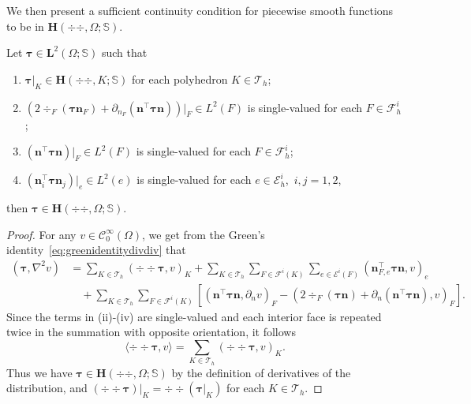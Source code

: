 We then present a sufficient continuity condition for piecewise smooth functions to be in $\boldsymbol{H}(\div{\div },\Omega; \mathbb{S})$. %




\begin{lemma}\label{lem:Hdivdivpatching}
Let $\boldsymbol \tau\in \boldsymbol  L^2(\Omega;\mathbb S)$ such that
\begin{enumerate}[\rm (i)]
\item $\boldsymbol \tau|_K\in \boldsymbol{H}(\div{\div },K; \mathbb{S})$ for each polyhedron  $K\in\mathcal T_h$;

\smallskip
\item $(2\div_F(\boldsymbol\tau \boldsymbol n_F)+ \partial_{n_F}(\boldsymbol n^{\intercal} \boldsymbol \tau\boldsymbol n))|_F\in L^2(F)$ is single-valued for each $F\in\mathcal F_h^i$;

\smallskip
\item $(\boldsymbol  n^{\intercal}\boldsymbol \tau\boldsymbol  n)|_F\in L^2(F)$ is single-valued for each $F\in\mathcal F_h^i$;

\smallskip
\item $(\boldsymbol  n_i^{\intercal}\boldsymbol \tau\boldsymbol  n_j)|_e\in L^2(e)$ is single-valued for each $e\in\mathcal E_h^i$, $\, i, j=1, 2$,

\end{enumerate}
then $\boldsymbol \tau\in \boldsymbol{H}(\div{\div },\Omega; \mathbb{S})$.
\end{lemma}
\begin{proof}
For any $v\in \mathcal C_0^{\infty}(\Omega)$, we get from the Green's identity~\eqref{eq:greenidentitydivdiv} that
\begin{align*}
(\boldsymbol \tau, \nabla^2v)&=\sum_{K\in\mathcal T_h}(\div\div\boldsymbol \tau, v)_K+\sum_{K\in\mathcal T_h}\sum_{F\in\mathcal F^i(K)}\sum_{e\in\mathcal E^i(F)}(\boldsymbol n_{F,e}^{\intercal}\boldsymbol \tau \boldsymbol n, v)_e\\
&\quad+\sum_{K\in\mathcal T_h}\sum_{F\in\mathcal F^i(K)}\left[(\boldsymbol  n^{\intercal}\boldsymbol \tau\boldsymbol  n, \partial_n v)_{F} -  ( 2\div_F(\boldsymbol \tau\boldsymbol n)+\partial_n (\boldsymbol  n^{\intercal}\boldsymbol \tau\boldsymbol  n), v)_F\right].
\end{align*}
Since the terms in (ii)-(iv) are single-valued and each interior face is repeated twice in the summation with opposite orientation, it follows
\[
\langle\div\div\boldsymbol \tau, v\rangle=\sum_{K\in\mathcal T_h}(\div\div\boldsymbol \tau, v)_K.
\]
Thus we have $\boldsymbol \tau\in \boldsymbol{H}(\div{\div },\Omega; \mathbb{S})$ by the definition of derivatives of the distribution, and $(\div\div\boldsymbol \tau)|_K=\div\div(\boldsymbol \tau|_K)$ for each $K\in\mathcal T_h$.
\end{proof}

